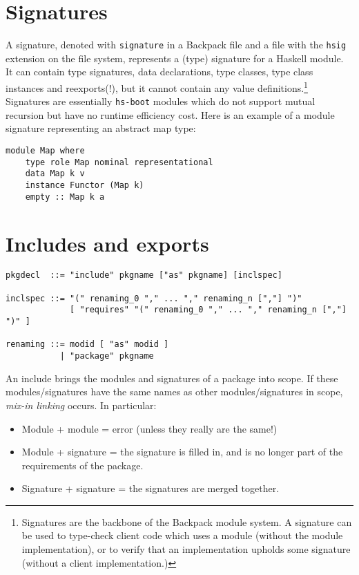 \documentclass{article}
\begin{document}
\section{Signatures}

A signature, denoted with \verb|signature| in a Backpack file and a file
with the \verb|hsig| extension on the file system, represents a (type) signature for a
Haskell module. It can contain type signatures, data declarations, type
classes, type class instances and reexports(!), but it cannot contain any
value definitions.\footnote{Signatures are the backbone of the Backpack
module system.  A signature can be used to type-check client code which
uses a module (without the module implementation), or to verify that an
implementation upholds some signature (without a client
implementation.)} Signatures are essentially
\texttt{hs-boot} modules which do not support mutual recursion but
have no runtime efficiency cost.  Here is an example of a module signature
representing an abstract map type:

\begin{verbatim}
module Map where
    type role Map nominal representational
    data Map k v
    instance Functor (Map k)
    empty :: Map k a
\end{verbatim}

\section{Includes and exports}

\begin{verbatim}
pkgdecl  ::= "include" pkgname ["as" pkgname] [inclspec]

inclspec ::= "(" renaming_0 "," ... "," renaming_n [","] ")"
             [ "requires" "(" renaming_0 "," ... "," renaming_n [","] ")" ]

renaming ::= modid [ "as" modid ]
           | "package" pkgname
\end{verbatim}


An include brings the modules and signatures of a package into scope.
If these modules/signatures have the same names as other
modules/signatures in scope, \emph{mix-in linking} occurs.
In particular:

\begin{itemize}
    \item Module + module = error (unless they really are the same!)
    \item Module + signature = the signature is filled in, and is
        no longer part of the requirements of the package.
    \item Signature + signature = the signatures are merged together.
\end{itemize}
\end{document}
